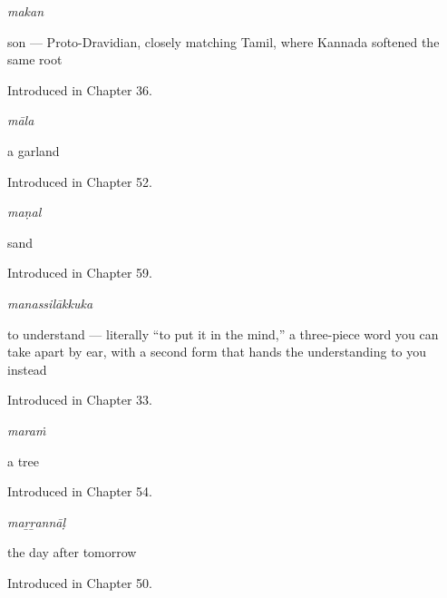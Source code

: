 \noindent\begin{minipage}[t]{\linewidth}
\raggedright
\textbf{}\enspace\emph{makan}\par
\small son — Proto-Dravidian, closely matching Tamil, where Kannada softened the same root\par
\footnotesize Introduced in Chapter 36.
\end{minipage}\par\medskip

\noindent\begin{minipage}[t]{\linewidth}
\raggedright
\textbf{}\enspace\emph{māla}\par
\small a garland\par
\footnotesize Introduced in Chapter 52.
\end{minipage}\par\medskip

\noindent\begin{minipage}[t]{\linewidth}
\raggedright
\textbf{}\enspace\emph{maṇal}\par
\small sand\par
\footnotesize Introduced in Chapter 59.
\end{minipage}\par\medskip

\noindent\begin{minipage}[t]{\linewidth}
\raggedright
\textbf{}\enspace\emph{manassilākkuka}\par
\small to understand — literally \textquotedblleft{}to put it in the mind,\textquotedblright{} a three-piece word you can take apart by ear, with a second form that hands the understanding to you instead\par
\footnotesize Introduced in Chapter 33.
\end{minipage}\par\medskip

\noindent\begin{minipage}[t]{\linewidth}
\raggedright
\textbf{}\enspace\emph{maraṁ}\par
\small a tree\par
\footnotesize Introduced in Chapter 54.
\end{minipage}\par\medskip

\noindent\begin{minipage}[t]{\linewidth}
\raggedright
\textbf{}\enspace\emph{maṟṟannāḷ}\par
\small the day after tomorrow\par
\footnotesize Introduced in Chapter 50.
\end{minipage}\par\medskip

